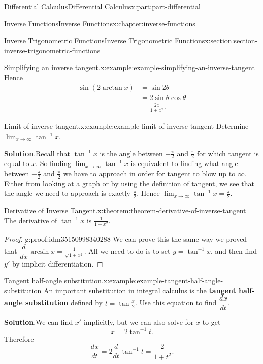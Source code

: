 \documentclass[twoside,10pt,]{tufte-book}
\newcommand{\blocktitlefont}{\relax}
\newcommand{\terminology}[1]{\textbf{#1}}
\numberwithin{equation}{part}
\newcommand{\dv}[3][]{\dfrac{d^{#1} #2}{d #3^{#1}}}
\begin{document}
\begin{partptx}{Differential Calculus}{}{Differential Calculus}{}{}{x:part:part-differential}
\begin{chapterptx}{Inverse Functions}{}{Inverse Functions}{}{}{x:chapter:inverse-functions}
\begin{sectionptx}{Inverse Trigonometric Functions}{}{Inverse Trigonometric Functions}{}{}{x:section:section-inverse-trigonometric-functions}
\begin{example}{Simplifying an inverse tangent.}{x:example:example-simplifying-an-inverse-tangent}
Hence%
\begin{align*}
\sin(2\arctan x) & = \sin2\theta \\
& = 2\sin\theta\cos\theta \\
& = \frac{2x}{1+x^{2}}. 
\end{align*}
%
\end{example}
\begin{example}{Limit of inverse tangent.}{x:example:example-limit-of-inverse-tangent}%
Determine \(\lim_{x\to\infty}\tan^{-1}x\).%
\par\smallskip%
\noindent\textbf{\blocktitlefont Solution}.\hypertarget{g:solution:idm35150998346304}{}\quad{}Recall that \(\tan^{-1}x\) is the angle between \(-\frac{\pi}{2}\) and \(\frac{\pi}{2}\) for which tangent is equal to \(x\). So finding \(\lim_{x\to\infty}\tan^{-1}x\) is equivalent to finding what angle between \(-\frac{\pi}{2}\) and \(\frac{\pi}{2}\) we have to approach in order for tangent to blow up to \(\infty\). Either from looking at a graph or by using the definition of tangent, we see that the angle we need to approach is exactly \(\frac{\pi}{2}\). Hence \(\lim_{x\to\infty}\tan^{-1}x = \frac{\pi}{2}\).%
\end{example}
\begin{theorem}{Derivative of Inverse Tangent.}{}{x:theorem:theorem-derivative-of-inverse-tangent}%
The derivative of \(\tan^{-1}x\) is \(\frac{1}{1+x^{2}}\).%
\end{theorem}
\begin{proof}{}{g:proof:idm35150998340288}
We can prove this the same way we proved that \(\dv{}{x}\arcsin x = \frac{1}{\sqrt{1+x^{2}}}\). All we need to do is to set \(y = \tan^{-1}x\), and then find \(y'\) by implicit differentiation.%
\end{proof}
\begin{example}{Tangent half-angle substitution.}{x:example:example-tangent-half-angle-substitution}%
An important substitution in integral calculus is the \terminology{tangent half-angle substitution} defined by \(t = \tan\frac{x}{2}\). Use this equation to find \(\dv{x}{t}\).%
\par\smallskip%
\noindent\textbf{\blocktitlefont Solution}.\hypertarget{g:solution:idm35150998402112}{}\quad{}We can find \(x'\) implicitly, but we can also solve for \(x\) to get%
\begin{equation*}
x = 2\tan^{-1}t.
\end{equation*}
Therefore%
\begin{equation*}
\dv{x}{t} = 2\dv{}{t}\tan^{-1}t = \frac{2}{1+t^{2}}.

\end{equation*}
\end{example}
\end{sectionptx}
\end{chapterptx}
\end{partptx}
\end{document}
